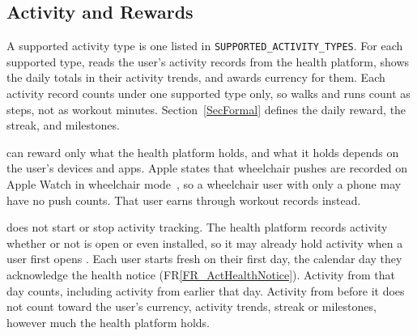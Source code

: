 \documentclass[12pt]{article}
\newcommand{\rref}[1]{FR\ref{#1}}
\begin{document}
\subsection{Activity and Rewards}

A supported activity type is one listed in
\texttt{SUPPORTED\_ACTIVITY\_\allowbreak TYPES}. For each supported type, \progname{}
reads the user's activity records from the health platform, shows the daily
totals in their activity trends, and awards currency for them. Each activity
record counts under one supported type only, so walks and runs count as steps,
not as workout minutes. Section~\ref{SecFormal} defines the daily reward, the
streak, and milestones.

\progname{} can reward only what the health platform holds, and what it holds
depends on the user's devices and apps. Apple states that wheelchair pushes are
recorded on Apple Watch in wheelchair mode~\citep{AppleHealthKit}, so a
wheelchair user with only a phone may have no push counts. That user earns
through workout records instead.

\progname{} does not start or stop activity tracking. The health platform
records activity whether or not \progname{} is open or even installed, so it
may already hold activity when a user first opens \progname{}. Each user starts
fresh on their first day, the calendar day they acknowledge the health notice
(\rref{FR_ActHealthNotice}). Activity from that day counts, including activity
from earlier that day. Activity from before it does not count toward the user's
currency, activity trends, streak or milestones, however much the health
platform holds.
\end{document}
